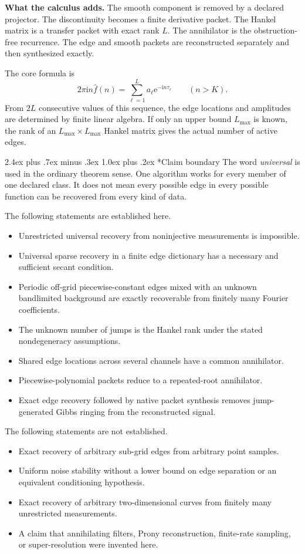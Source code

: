\documentclass[11pt,oneside]{book}
\makeatletter
\renewcommand\chapter{\@startsection{chapter}{0}{\z@}%
  {2.4ex plus .7ex minus .3ex}%
  {1.0ex plus .2ex}%
  {\normalfont\LARGE\bfseries\color{Ink}}}
\theoremstyle{remark}
\newcommand{\e}{\mathrm e}
\newcommand{\ii}{\mathrm i}
\newcommand{\StatusBox}[2]{%
\begin{center}
\colorbox{#1}{\parbox{0.93\linewidth}{\vspace{5pt}\small #2\vspace{5pt}}}
\end{center}}
\makeatother
\begin{document}
\StatusBox{PaleBlue}{\textbf{What the calculus adds.} The smooth component is removed by a declared projector. The discontinuity becomes a finite derivative packet. The Hankel matrix is a transfer packet with exact rank \(L\). The annihilator is the obstruction-free recurrence. The edge and smooth packets are reconstructed separately and then synthesized exactly.}

The core formula is
\[
\boxed{
2\pi\ii n\widehat f(n)
=
\sum_{\ell=1}^{L}a_\ell \e^{-\ii n\tau_\ell}
\qquad(n>K).
}
\]
From \(2L\) consecutive values of this sequence, the edge locations and amplitudes are determined by finite linear algebra. If only an upper bound \(L_{\max}\) is known, the rank of an \(L_{\max}\times L_{\max}\) Hankel matrix gives the actual number of active edges.

\chapter*{Claim boundary}
The word \emph{universal} is used in the ordinary theorem sense. One algorithm works for every member of one declared class. It does not mean every possible edge in every possible function can be recovered from every kind of data.

The following statements are established here.
\begin{itemize}
\item Unrestricted universal recovery from noninjective measurements is impossible.
\item Universal sparse recovery in a finite edge dictionary has a necessary and sufficient secant condition.
\item Periodic off-grid piecewise-constant edges mixed with an unknown bandlimited background are exactly recoverable from finitely many Fourier coefficients.
\item The unknown number of jumps is the Hankel rank under the stated nondegeneracy assumptions.
\item Shared edge locations across several channels have a common annihilator.
\item Piecewise-polynomial packets reduce to a repeated-root annihilator.
\item Exact edge recovery followed by native packet synthesis removes jump-generated Gibbs ringing from the reconstructed signal.
\end{itemize}

The following statements are not established.
\begin{itemize}
\item Exact recovery of arbitrary sub-grid edges from arbitrary point samples.
\item Uniform noise stability without a lower bound on edge separation or an equivalent conditioning hypothesis.
\item Exact recovery of arbitrary two-dimensional curves from finitely many unrestricted measurements.
\item A claim that annihilating filters, Prony reconstruction, finite-rate sampling, or super-resolution were invented here.
\end{itemize}
\end{document}
